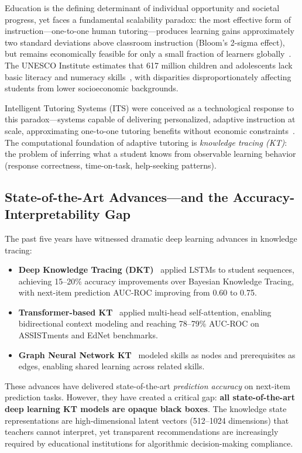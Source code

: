 \documentclass[10pt,twocolumn]{article}
\begin{document}
Education is the defining determinant of individual opportunity and societal progress, yet faces a fundamental scalability paradox: the most effective form of instruction—one-to-one human tutoring—produces learning gains approximately two standard deviations above classroom instruction (Bloom's 2-sigma effect), but remains economically feasible for only a small fraction of learners globally~\cite{bloom2023}. The UNESCO Institute estimates that 617 million children and adolescents lack basic literacy and numeracy skills~\cite{unesco2023}, with disparities disproportionately affecting students from lower socioeconomic backgrounds.

Intelligent Tutoring Systems (ITS) were conceived as a technological response to this paradox—systems capable of delivering personalized, adaptive instruction at scale, approximating one-to-one tutoring benefits without economic constraints~\cite{vanlahn2022}. The computational foundation of adaptive tutoring is \textit{knowledge tracing (KT)}: the problem of inferring what a student knows from observable learning behavior (response correctness, time-on-task, help-seeking patterns).

\subsection{State-of-the-Art Advances—and the Accuracy-Interpretability Gap}

The past five years have witnessed dramatic deep learning advances in knowledge tracing:

\begin{itemize}
  \item \textbf{Deep Knowledge Tracing (DKT)}~\cite{piech2015} applied LSTMs to student sequences, achieving 15--20\% accuracy improvements over Bayesian Knowledge Tracing, with next-item prediction AUC-ROC improving from 0.60 to 0.75.
  
  \item \textbf{Transformer-based KT}~\cite{liu2023} applied multi-head self-attention, enabling bidirectional context modeling and reaching 78--79\% AUC-ROC on ASSISTments and EdNet benchmarks.
  
  \item \textbf{Graph Neural Network KT}~\cite{choi2020} modeled skills as nodes and prerequisites as edges, enabling shared learning across related skills.
\end{itemize}

These advances have delivered state-of-the-art \textit{prediction accuracy} on next-item prediction tasks. However, they have created a critical gap: \textbf{all state-of-the-art deep learning KT models are opaque black boxes}. The knowledge state representations are high-dimensional latent vectors (512--1024 dimensions) that teachers cannot interpret, yet transparent recommendations are increasingly required by educational institutions for algorithmic decision-making compliance.
\end{document}
